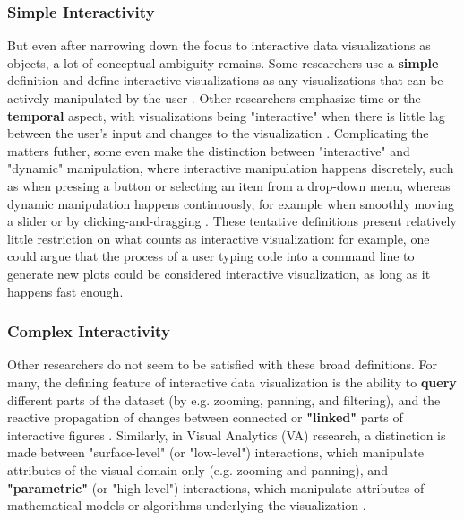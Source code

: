 \documentclass[12pt,a4paper]{article}
\begin{document}
\subsubsection{Simple Interactivity}

But even after narrowing down the focus to interactive data visualizations as objects, a lot of conceptual ambiguity remains. Some researchers use a \textbf{simple} definition and define interactive visualizations as any visualizations that can be actively manipulated by the user \citep{brodbeck2009}. Other researchers emphasize time or the \textbf{temporal} aspect, with visualizations being "interactive" when there is little lag between the user's input and changes to the visualization \citep{becker1987,buja1996}. Complicating the matters futher, some even make the distinction between "interactive" and "dynamic" manipulation, where interactive manipulation happens discretely, such as when pressing a button or selecting an item from a drop-down menu, whereas dynamic manipulation happens continuously, for example when smoothly moving a slider or by clicking-and-dragging \citep{rheingans2002,jankun2007model}. These tentative definitions present relatively little restriction on what counts as interactive visualization: for example, one could argue that the process of a user typing code into a command line to generate new plots could be considered interactive visualization, as long as it happens fast enough. 

\subsubsection{Complex Interactivity}

Other researchers do not seem to be satisfied with these broad definitions. For many, the defining feature of interactive data visualization is the ability to \textbf{query} different parts of the dataset (by e.g. zooming, panning, and filtering), and the reactive propagation of changes between connected or \textbf{"linked"} parts of interactive figures \citep{kehrer2012,buja1996,keim2002,unwin1999}. Similarly, in Visual Analytics (VA) research, a distinction is made between "surface-level" (or "low-level") interactions, which manipulate attributes of the visual domain only (e.g. zooming and panning), and \textbf{"parametric"} (or "high-level") interactions, which manipulate attributes of mathematical models or algorithms underlying the visualization \citep{leman2013,pike2009}. 
\end{document}

